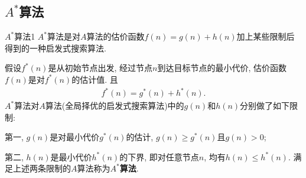 \subsection{$A^*$算法}
\begin{mydef}{$A^*$算法}{1}
    $A^*$算法是对$A$算法的估价函数$f(n)=g(n)+h(n)$加上某些限制后得到的一种启发式搜索算法.
\end{mydef}

假设$f^*(n)$是从初始节点出发, 经过节点$n$到达目标节点的最小代价, 估价函数$f(n)$是对$f^*(n)$的估计值. 且
\begin{align}
    f^*(n)=g^*(n)+h^*(n).
\end{align}
$A^*$算法对$A$算法(全局择优的启发式搜索算法)中的$g(n)$和$h(n)$分别做了如下限制:

第一, $g(n)$是对最小代价$g^*(n)$的估计, $g(n)\geq g^*(n)$且$g(n)>0$;

第二, $h(n)$是最小代价$h^*(n)$的下界, 即对任意节点$n$, 均有$h(n)\leq h^*(n)$.
满足上述两条限制的$A$算法称为\textbf{$A^*$算法}.
